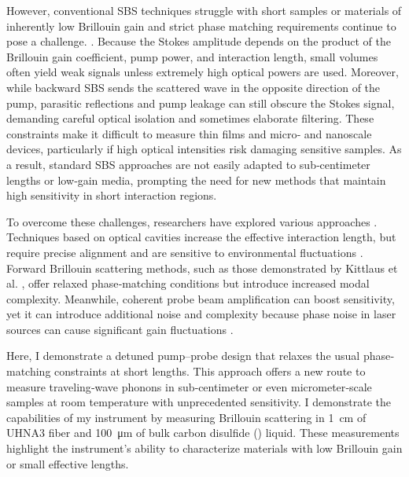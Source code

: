 However, conventional \ac{SBS} techniques struggle with short samples or materials of inherently low Brillouin gain and strict phase matching requirements continue to pose a challenge. \cite{rakich2012giant, gyger2020observation, yu2024chip}. Because the Stokes amplitude depends on the product of the Brillouin gain coefficient, pump power, and interaction length, small volumes often yield weak signals unless extremely high optical powers are used. Moreover, while backward \ac{SBS} sends the scattered wave in the opposite direction of the pump, parasitic reflections and pump leakage can still obscure the Stokes signal, demanding careful optical isolation and sometimes elaborate filtering. These constraints make it difficult to measure thin films and micro‐ and nanoscale devices, particularly if high optical intensities risk damaging sensitive samples. As a result, standard \ac{SBS} approaches are not easily adapted to sub‐centimeter lengths or low‐gain media, prompting the need for new methods that maintain high sensitivity in short interaction regions.

To overcome these challenges, researchers have explored various approaches \cite{shin2013tailorable, van2015interaction, kittlaus2016large, djadaojee2020stimulated, gusev2018advances, gerakis2011coherent}. Techniques based on optical cavities increase the effective interaction length, but require precise alignment and are sensitive to environmental fluctuations \cite{pant2011cavity}. Forward Brillouin scattering methods, such as those demonstrated by Kittlaus et al. \cite{kittlaus2017chip}, offer relaxed phase‐matching conditions but introduce increased modal complexity. Meanwhile, coherent probe beam amplification can boost sensitivity, yet it can introduce additional noise and complexity because phase noise in laser sources can cause significant gain fluctuations \cite{shlomovits2015effect}.

Here, I demonstrate a detuned pump–probe design that relaxes the usual phase‐matching constraints at short lengths. This approach offers a new route to measure traveling‐wave phonons in sub‐centimeter or even micrometer‐scale samples at room temperature with unprecedented sensitivity. I demonstrate the capabilities of my instrument by measuring Brillouin scattering in \SI{1}{\centi\meter} of \ac{UHNA3} fiber and \SI{100}{\micro\meter} of bulk carbon disulfide () liquid. These measurements highlight the instrument’s ability to characterize materials with low Brillouin gain or small effective lengths.

